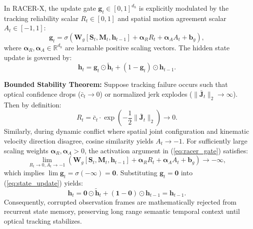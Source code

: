 \documentclass[10pt,conference]{IEEEtran}
\begin{document}
In RACER-X, the update gate $\mathbf{g}_t \in [0, 1]^{d_h}$ is explicitly modulated by the tracking reliability scalar $R_t \in [0, 1]$ and spatial motion agreement scalar $A_t \in [-1, 1]$:
\begin{equation}
\mathbf{g}_t = \sigma\left(\mathbf{W}_g [\mathbf{S}_t, \mathbf{M}_t, \mathbf{h}_{t-1}] + \boldsymbol{\alpha}_R R_t + \boldsymbol{\alpha}_A A_t + \mathbf{b}_g\right),
\label{eq:racer_gate}
\end{equation}
where $\boldsymbol{\alpha}_R, \boldsymbol{\alpha}_A \in \mathbb{R}^{d_h}$ are learnable positive scaling vectors. The hidden state update is governed by:
\begin{equation}
\mathbf{h}_t = \mathbf{g}_t \odot \tilde{\mathbf{h}}_t + (1 - \mathbf{g}_t) \odot \mathbf{h}_{t-1}.
\label{eq:state_update}
\end{equation}

\textbf{Bounded Stability Theorem:} Suppose tracking failure occurs such that optical confidence drops ($\bar{c}_t \to 0$) or normalized jerk explodes ($\|\bar{\mathbf{J}}_t\|_2 \to \infty$). Then by definition:
\begin{equation}
R_t = \bar{c}_t \cdot \exp\left(-\frac{1}{2}\|\bar{\mathbf{J}}_t\|_2\right) \longrightarrow 0.
\end{equation}
Similarly, during dynamic conflict where spatial joint configuration and kinematic velocity direction disagree, cosine similarity yields $A_t \to -1$. For sufficiently large scaling weights $\boldsymbol{\alpha}_R, \boldsymbol{\alpha}_A > 0$, the activation argument in (\ref{eq:racer_gate}) satisfies:
\begin{equation}
\lim_{R_t \to 0, A_t \to -1} \left(\mathbf{W}_g [\mathbf{S}_t, \mathbf{M}_t, \mathbf{h}_{t-1}] + \boldsymbol{\alpha}_R R_t + \boldsymbol{\alpha}_A A_t + \mathbf{b}_g\right) \to -\infty,
\end{equation}
which implies $\lim \mathbf{g}_t = \sigma(-\infty) = \mathbf{0}$. Substituting $\mathbf{g}_t = \mathbf{0}$ into (\ref{eq:state_update}) yields:
\begin{equation}
\mathbf{h}_t = \mathbf{0} \odot \tilde{\mathbf{h}}_t + (\mathbf{1} - \mathbf{0}) \odot \mathbf{h}_{t-1} = \mathbf{h}_{t-1}.
\end{equation}
Consequently, corrupted observation frames are mathematically rejected from recurrent state memory, preserving long range semantic temporal context until optical tracking stabilizes.
\end{document}

